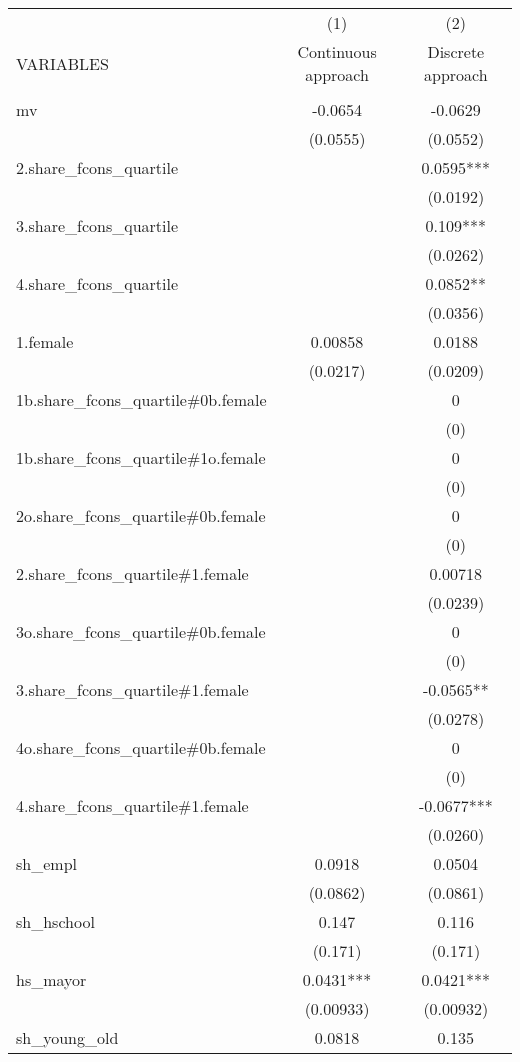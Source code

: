 \documentclass[]{article}
\begin{document}
\begin{tabular}{lcc} \hline
 & (1) & (2) \\
VARIABLES & Continuous approach & Discrete approach \\ \hline
 &  &  \\
mv & -0.0654 & -0.0629 \\
 & (0.0555) & (0.0552) \\
2.share\_fcons\_quartile &  & 0.0595*** \\
 &  & (0.0192) \\
3.share\_fcons\_quartile &  & 0.109*** \\
 &  & (0.0262) \\
4.share\_fcons\_quartile &  & 0.0852** \\
 &  & (0.0356) \\
1.female & 0.00858 & 0.0188 \\
 & (0.0217) & (0.0209) \\
1b.share\_fcons\_quartile\#0b.female &  & 0 \\
 &  & (0) \\
1b.share\_fcons\_quartile\#1o.female &  & 0 \\
 &  & (0) \\
2o.share\_fcons\_quartile\#0b.female &  & 0 \\
 &  & (0) \\
2.share\_fcons\_quartile\#1.female &  & 0.00718 \\
 &  & (0.0239) \\
3o.share\_fcons\_quartile\#0b.female &  & 0 \\
 &  & (0) \\
3.share\_fcons\_quartile\#1.female &  & -0.0565** \\
 &  & (0.0278) \\
4o.share\_fcons\_quartile\#0b.female &  & 0 \\
 &  & (0) \\
4.share\_fcons\_quartile\#1.female &  & -0.0677*** \\
 &  & (0.0260) \\
sh\_empl & 0.0918 & 0.0504 \\
 & (0.0862) & (0.0861) \\
sh\_hschool & 0.147 & 0.116 \\
 & (0.171) & (0.171) \\
hs\_mayor & 0.0431*** & 0.0421*** \\
 & (0.00933) & (0.00932) \\
sh\_young\_old & 0.0818 & 0.135 \\

\end{tabular}
\end{document}
